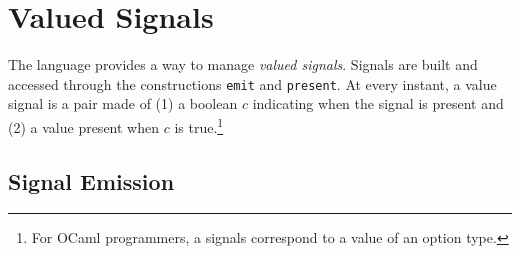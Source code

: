 \documentclass[11pt,titlepage,twoside]{report}
\newcommand{\ocaml}{{\sf OCaml}}
\begin{document}



\section{Valued Signals\label{signals}} %

The language provides a way to manage {\em valued signals}. Signals
are built and accessed through the constructions \verb-emit- and
\verb-present-.  At every instant, a value signal is a pair made of (1) a boolean
$c$ indicating when the signal is present and (2) a value present when $c$ is
true.\footnote{For \ocaml{} programmers, a signals correspond to a value
of an option type.}
 
\subsection{Signal Emission\label{emit}} %
\end{document}
